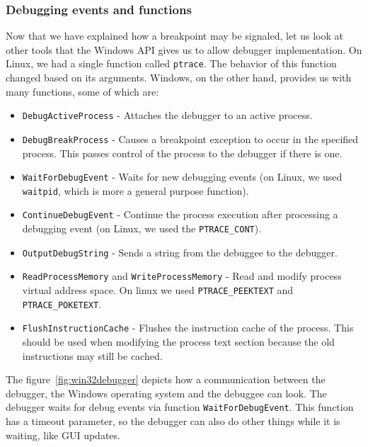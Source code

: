 \subsubsection*{Debugging events and functions}
Now that we have explained how a breakpoint may be signaled, let us look at
other tools that the Windows API gives us to allow debugger implementation. On
Linux, we had a single function called \texttt{ptrace}. The behavior of this
function changed based on its arguments. Windows, on the other hand, provides
us with many functions, some of which are:

\begin{itemize}
    \item \texttt{DebugActiveProcess} - Attaches the debugger to an
        active process.
    \item \texttt{DebugBreakProcess} - Causes a breakpoint exception to
        occur in the specified process. This passes control of the process to
        the debugger if there is one.
    \item \texttt{WaitForDebugEvent} - Waits for new debugging events
        (on Linux, we used \texttt{waitpid}, which is more a general purpose
        function).
    \item \texttt{ContinueDebugEvent} - Continue the process execution
        after processing a debugging event (on Linux, we used the
        \texttt{PTRACE\_CONT}).
    \item \texttt{OutputDebugString} - Sends a string from the debuggee
        to the debugger.
    \item \texttt{ReadProcessMemory} and
    \texttt{WriteProcessMemory} - Read and modify process virtual
        address space. On linux we used \texttt{PTRACE\_PEEKTEXT} and
        \texttt{PTRACE\_POKETEXT}.
    \item \texttt{FlushInstructionCache} - Flushes the instruction cache
        of the process. This should be used when modifying the process text
        section because the old instructions may still be cached.
\end{itemize}

The figure~\ref{fig:win32debugger} depicts how a communication between the
debugger, the Windows operating system and the debuggee can look. The debugger
waits for debug events via function \texttt{WaitForDebugEvent}. This
function has a timeout parameter, so the debugger can also do other things
while it is waiting, like GUI updates.

